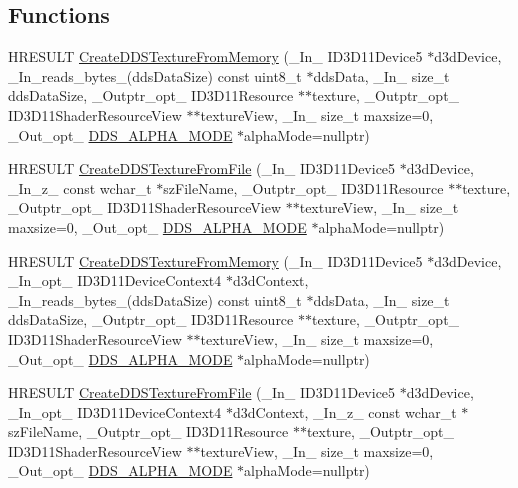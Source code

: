 \subsection*{Functions}
\begin{DoxyCompactItemize}
\item 
H\+R\+E\+S\+U\+LT \hyperlink{namespace_direct_x_a25798423a4c44e7ede68c7a82f500277}{Create\+D\+D\+S\+Texture\+From\+Memory} (\+\_\+\+In\+\_\+ I\+D3\+D11\+Device5 $\ast$d3d\+Device, \+\_\+\+In\+\_\+reads\+\_\+bytes\+\_\+(dds\+Data\+Size) const uint8\+\_\+t $\ast$dds\+Data, \+\_\+\+In\+\_\+ size\+\_\+t dds\+Data\+Size, \+\_\+\+Outptr\+\_\+opt\+\_\+ I\+D3\+D11\+Resource $\ast$$\ast$texture, \+\_\+\+Outptr\+\_\+opt\+\_\+ I\+D3\+D11\+Shader\+Resource\+View $\ast$$\ast$texture\+View, \+\_\+\+In\+\_\+ size\+\_\+t maxsize=0, \+\_\+\+Out\+\_\+opt\+\_\+ \hyperlink{namespace_direct_x_a7cb48689d75471680c0bf7f79caaaf1f}{D\+D\+S\+\_\+\+A\+L\+P\+H\+A\+\_\+\+M\+O\+DE} $\ast$alpha\+Mode=nullptr)
\item 
H\+R\+E\+S\+U\+LT \hyperlink{namespace_direct_x_a6d0e651525f039618c9212e470601abb}{Create\+D\+D\+S\+Texture\+From\+File} (\+\_\+\+In\+\_\+ I\+D3\+D11\+Device5 $\ast$d3d\+Device, \+\_\+\+In\+\_\+z\+\_\+ const wchar\+\_\+t $\ast$sz\+File\+Name, \+\_\+\+Outptr\+\_\+opt\+\_\+ I\+D3\+D11\+Resource $\ast$$\ast$texture, \+\_\+\+Outptr\+\_\+opt\+\_\+ I\+D3\+D11\+Shader\+Resource\+View $\ast$$\ast$texture\+View, \+\_\+\+In\+\_\+ size\+\_\+t maxsize=0, \+\_\+\+Out\+\_\+opt\+\_\+ \hyperlink{namespace_direct_x_a7cb48689d75471680c0bf7f79caaaf1f}{D\+D\+S\+\_\+\+A\+L\+P\+H\+A\+\_\+\+M\+O\+DE} $\ast$alpha\+Mode=nullptr)
\item 
H\+R\+E\+S\+U\+LT \hyperlink{namespace_direct_x_a5d1885e67a0c98b03ef0eafe9c54622b}{Create\+D\+D\+S\+Texture\+From\+Memory} (\+\_\+\+In\+\_\+ I\+D3\+D11\+Device5 $\ast$d3d\+Device, \+\_\+\+In\+\_\+opt\+\_\+ I\+D3\+D11\+Device\+Context4 $\ast$d3d\+Context, \+\_\+\+In\+\_\+reads\+\_\+bytes\+\_\+(dds\+Data\+Size) const uint8\+\_\+t $\ast$dds\+Data, \+\_\+\+In\+\_\+ size\+\_\+t dds\+Data\+Size, \+\_\+\+Outptr\+\_\+opt\+\_\+ I\+D3\+D11\+Resource $\ast$$\ast$texture, \+\_\+\+Outptr\+\_\+opt\+\_\+ I\+D3\+D11\+Shader\+Resource\+View $\ast$$\ast$texture\+View, \+\_\+\+In\+\_\+ size\+\_\+t maxsize=0, \+\_\+\+Out\+\_\+opt\+\_\+ \hyperlink{namespace_direct_x_a7cb48689d75471680c0bf7f79caaaf1f}{D\+D\+S\+\_\+\+A\+L\+P\+H\+A\+\_\+\+M\+O\+DE} $\ast$alpha\+Mode=nullptr)
\item 
H\+R\+E\+S\+U\+LT \hyperlink{namespace_direct_x_a67e4dccf77f4503dd6b3a35decc7f5c0}{Create\+D\+D\+S\+Texture\+From\+File} (\+\_\+\+In\+\_\+ I\+D3\+D11\+Device5 $\ast$d3d\+Device, \+\_\+\+In\+\_\+opt\+\_\+ I\+D3\+D11\+Device\+Context4 $\ast$d3d\+Context, \+\_\+\+In\+\_\+z\+\_\+ const wchar\+\_\+t $\ast$sz\+File\+Name, \+\_\+\+Outptr\+\_\+opt\+\_\+ I\+D3\+D11\+Resource $\ast$$\ast$texture, \+\_\+\+Outptr\+\_\+opt\+\_\+ I\+D3\+D11\+Shader\+Resource\+View $\ast$$\ast$texture\+View, \+\_\+\+In\+\_\+ size\+\_\+t maxsize=0, \+\_\+\+Out\+\_\+opt\+\_\+ \hyperlink{namespace_direct_x_a7cb48689d75471680c0bf7f79caaaf1f}{D\+D\+S\+\_\+\+A\+L\+P\+H\+A\+\_\+\+M\+O\+DE} $\ast$alpha\+Mode=nullptr)

\end{DoxyCompactItemize}
